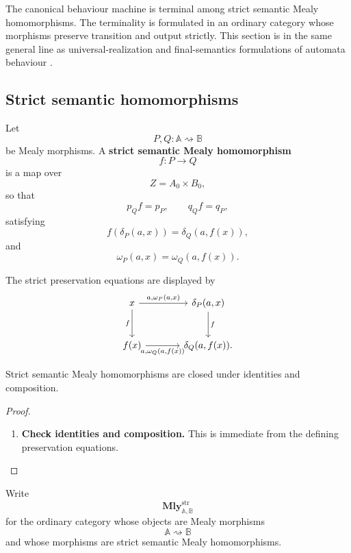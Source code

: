 The canonical behaviour machine is terminal among strict semantic Mealy homomorphisms. The terminality is formulated in an ordinary category whose morphisms preserve transition and output strictly. This section is in the same general line as universal-realization and final-semantics formulations of automata behaviour \cite{Goguen1973,Rutten1998,Rutten2000}.

\subsection{Strict semantic homomorphisms}
\label{subsec:strict-semantic-homomorphisms}

\begin{definition}
\label{def:strict-semantic-mealy-homomorphism}
    Let
    \[
        P,Q:\mathbb A\rightsquigarrow\mathbb B
    \]
    be Mealy morphisms. A \textbf{strict semantic Mealy homomorphism}
    \[
        f:P\to Q
    \]
    is a map over
    \[
        Z=A_0\times B_0,
    \]
    so that
    \[
        p_Qf=p_P,
        \qquad
        q_Qf=q_P,
    \]
    satisfying
    \[
        f(\delta_P(a,x))=\delta_Q(a,f(x)),
    \]
    and
    \[
        \omega_P(a,x)=\omega_Q(a,f(x)).
    \]
\end{definition}

The strict preservation equations are displayed by
\[
    \begin{tikzcd}[column sep=large, row sep=large]
        x
            \arrow[r, "{a,\omega_P(a,x)}"]
            \arrow[d, "f"']
        &
            \delta_P(a,x)
                \arrow[d, "f"]
        \\
            f(x)
                \arrow[r, "{a,\omega_Q(a,f(x))}"']
        &
            \delta_Q(a,f(x)).
    \end{tikzcd}
\]

\begin{lemma}
\label{lem:strict-semantic-category}
    Strict semantic Mealy homomorphisms are closed under identities and composition.
\end{lemma}
\begin{proof}
    \leavevmode
    \begin{enumerate}
        \item \textbf{Check identities and composition.} This is immediate from the defining preservation equations.
    \end{enumerate}
\end{proof}

\begin{notation}
\label{not:strict-semantic-category}
    Write
    \[
        \mathbf{Mly}^{\mathrm{str}}_{\mathbb A,\mathbb B}
    \]
    for the ordinary category whose objects are Mealy morphisms
    \[
        \mathbb A\rightsquigarrow\mathbb B
    \]
    and whose morphisms are strict semantic Mealy homomorphisms.
\end{notation}

